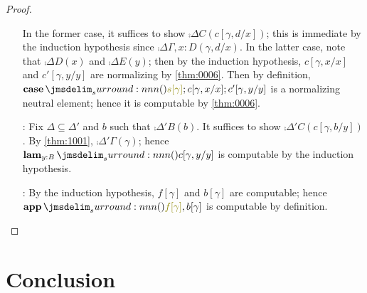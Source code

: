 \documentclass[a4paper]{article}
\begin{document}
\begin{proof}
\begin{itemize}
    In the former case, it suffices to show $\comp{\Delta}{C}(c[\gamma,d/x])$; this is immediate by the induction hypothesis since $\comp{\Delta}{\Gamma,x : D}(\gamma, d/x)$.
    In the latter case, note that $\comp{\Delta}{D}(x)$ and $\comp{\Delta}{E}(y)$; then by the induction hypothesis, $c[\gamma,x/x]$ and $c'[\gamma,y/y]$ are normalizing by \cref{thm:0006}.
    Then by definition, $\tmCase{s[\gamma]}{c[\gamma,x/x]}{c'[\gamma,y/y]}$ is a normalizing neutral element; hence it is computable by \cref{thm:0006}.
  \item[\rFunI:] Fix $\Delta \subseteq \Delta'$ and $b$ such that $\comp{\Delta'}{B}(b)$.
    It suffices to show $\comp{\Delta'}{C}(c[\gamma,b/y])$.
    By \cref{thm:1001}, $\comp{\Delta'}{\Gamma}(\gamma)$; hence $\tmLam{y:B}{c[\gamma,y/y]}$ is computable by the induction hypothesis.
  \item[\rFunE:] By the induction hypothesis, $f[\gamma]$ and $b[\gamma]$ are computable; hence $\tmApp{f[\gamma]}{b[\gamma]}$ is computable by definition.
  \end{itemize}
\end{proof}

\section{Conclusion}
\label{sec:0007}





\end{document}
